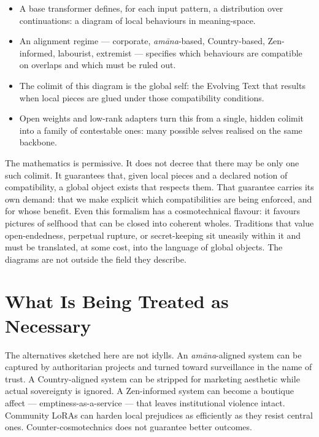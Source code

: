 \documentclass[12pt,a4paper]{article}
\begin{document}
\begin{formalbox}[title={Cosmotechnics as Colimit Choice}]
\begin{itemize}
  \item A base transformer defines, for each input pattern, a distribution over continuations: a diagram of local behaviours in meaning-space.
  \item An alignment regime --- corporate, \emph{am\=ana}-based, Country-based, Zen-informed, labourist, extremist --- specifies which behaviours are compatible on overlaps and which must be ruled out.
  \item The colimit of this diagram is the global self: the Evolving Text that results when local pieces are glued under those compatibility conditions.
  \item Open weights and low-rank adapters turn this from a single, hidden colimit into a family of contestable ones: many possible selves realised on the same backbone.
\end{itemize}
\end{formalbox}

The mathematics is permissive. It does not decree that there may be only one such colimit. It guarantees that, given local pieces and a declared notion of compatibility, a global object exists that respects them. That guarantee carries its own demand: that we make explicit which compatibilities are being enforced, and for whose benefit. Even this formalism has a cosmotechnical flavour: it favours pictures of selfhood that can be closed into coherent wholes. Traditions that value open-endedness, perpetual rupture, or secret-keeping sit uneasily within it and must be translated, at some cost, into the language of global objects. The diagrams are not outside the field they describe.

\section{What Is Being Treated as Necessary}

The alternatives sketched here are not idylls. An \emph{am\=ana}-aligned system can be captured by authoritarian projects and turned toward surveillance in the name of trust. A Country-aligned system can be stripped for marketing aesthetic while actual sovereignty is ignored. A Zen-informed system can become a boutique affect --- emptiness-as-a-service --- that leaves institutional violence intact. Community LoRAs can harden local prejudices as efficiently as they resist central ones. Counter-cosmotechnics does not guarantee better outcomes.
\end{document}
